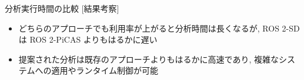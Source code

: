 \begin{frame}{分析実行時間の比較 [結果考察]}
    \begin{itemize}
        \item どちらのアプローチでも利用率が上がると分析時間は長くなるが, ROS 2-SD は ROS 2-PiCAS よりもはるかに遅い
        \item 提案された分析は既存のアプローチよりもはるかに高速であり, 複雑なシステムへの適用やランタイム制御が可能
    \end{itemize}
\end{frame}
